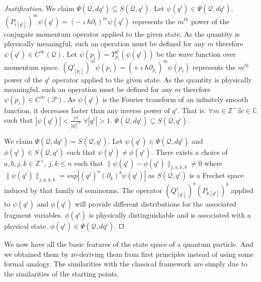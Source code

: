\documentclass[smallextended]{svjour3}
\numberwithin{equation}{section}
\newenvironment{justification}{\emph{Justification}.}{\hfill\(\qed\)}
\begin{document}
\begin{justification}
	We claim $\Psi(\mathcal{Q}, dq^i) \subseteq S(\mathcal{Q}, q^i)$. Let $\psi(q^i) \in \Psi(\mathcal{Q}, dq^i)$. $(P_{i [q^i]})^m \psi(q^i) = (-\imath \hbar \partial_i)^m \psi(q^i)$ represents the $m^{th}$ power of the conjugate momentum operator applied to the given state. As the quantity is physically meaningful, such an operation must be defined for any $m$ therefore $\psi(q^i) \in C^\infty(\mathcal{Q})$. Let $\psi(p_i) = \Upsilon^{q^i}_{p_i} (\psi(q^i))$ be the wave function over momentum space. $(Q^i_{[p_i]})^m \psi(p_i) = (+\imath \hbar \partial_{p_i})^m \psi(p_i)$ represents the $m^{th}$ power of the $q^i$ operator applied to the given state. As the quantity is physically meaningful, such an operation must be defined for any $m$ therefore $\psi(p_i) \in C^\infty(\mathcal{P})$. As $\psi(q^i)$ is the Fourier transform of an infinitely smooth function, it decreases faster than any inverse power of $q^i$. That is: $\forall m \in \mathbb{Z}^+ \exists c \in \mathbb{C}$ such that  $|\psi(q^i)|<\frac{|c|}{|q^i|^m} \; \forall |q^i|> 1$. $\Psi(\mathcal{Q}, dq^i) \subseteq S(\mathcal{Q}, q^i)$.
	
	We claim $\Psi(\mathcal{Q}, dq^i) = S(\mathcal{Q}, q^i)$. Let $\psi(q^i) \in \Psi(\mathcal{Q}, dq^i)$ and $\phi(q^i) \in S(\mathcal{Q}, q^i)$ such that $\psi(q^i) \neq \phi(q^i)$. There exists a choice of $a, b, j, k \in \mathbb{Z}^+$, $j,k \leq n$ such that $\lVert \psi(q^i) - \phi(q^i) \rVert_{j,a,k,b} \neq 0$  where $\lVert \psi(q^i) \rVert_{j,a,k,b} = sup|(q^j)^a (\partial_k) ^b \psi(q^i)|$ as $S(\mathcal{Q}, q^i)$ is a Frechet space induced by that family of seminorms. The operator $(Q^j_{[q^i]})^a(P_{k [q^i]})^b$ applied to $\psi(q^i)$ and $\phi(q^i)$ will provide different distributions for the associated fragment variables. $\phi(q^i)$ is physically distinguishable and is associated with a physical state. $\phi(q^i) \in \Psi(\mathcal{Q}, dq^i)$.
\end{justification}

We now have all the basic features of the state space of a quantum particle. And we obtained them by re-deriving them from first principles instead of using some formal analogy. The similarities with the classical framework are simply due to the similarities of the starting points.
\end{document}
